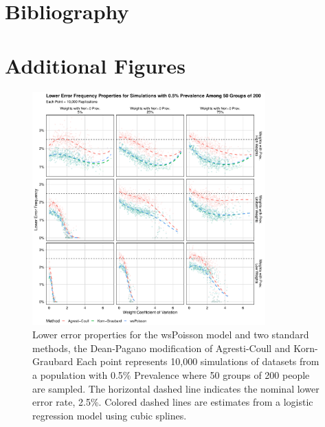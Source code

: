 \documentclass[AMA,STIX1COL]{WileyNJD-v2}
\begin{document}
\section{Bibliography}
\nocite{*}%
%

\appendix
\section{Additional Figures}

\begin{figure}
\centering
\includegraphics[width=0.8\textwidth]{figures/perfect_lower_error_frequency_50_groups_0_005_prev.pdf}
\caption{Lower error properties for the wsPoisson model and two standard methods, the Dean-Pagano modification of Agresti-Coull and Korn-Graubard
Each point represents 10,000 simulations of datasets from a population with 0.5\% Prevalence where 50 groups of 200 people are sampled.
The horizontal dashed line indicates the nominal lower error rate, 2.5\%.
Colored dashed lines are estimates from a logistic regression model using cubic splines.}
\label{fig:perfect_lower_error_frequency_50_groups_0_005_prev}
\end{figure}
\end{document}
